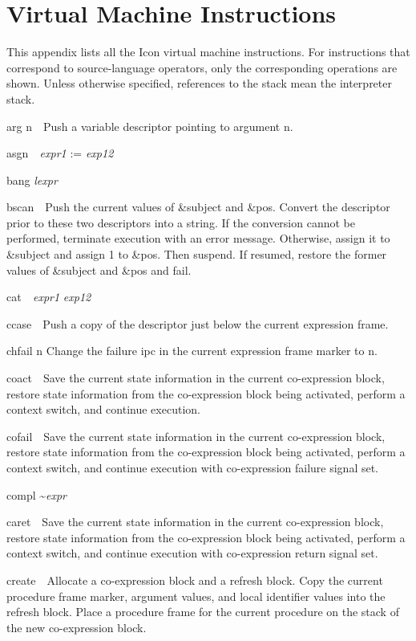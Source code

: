 \chapter{Virtual Machine Instructions}

This appendix lists all the Icon virtual machine instructions. For
instructions that correspond to source-language operators, only the
corresponding operations are shown. Unless otherwise specified,
references to the stack mean the interpreter stack.


arg n\ \ Push a variable descriptor pointing to argument n.


asgn\textit{\ \ expr1 }:= \textit{exp12}


bang \textit{lexpr}


bscan\ \ Push the current values of \&subject and \&pos. Convert the
descriptor prior to these two descriptors into a string. If the
conversion cannot be performed, terminate execution with an error
message. Otherwise, assign it to \&subject and assign 1 to \&pos. Then
suspend. If resumed, restore the former values of \&subject and \&pos
and fail.


cat\textit{\ \ expr1 {\textbar}{\textbar}} \textit{exp12}


ccase\ \ Push a copy of the descriptor just below the current expression frame.


chfail n Change the failure ipc in the current expression frame marker to n.


coact\ \ Save the current state information in the current
co-expression block, restore state information from the co-expression
block being activated, perform a context switch, and continue
execution.


cofail\ \ Save the current state information in the current
co-expression block, restore state information from the co-expression
block being activated, perform a context switch, and continue
execution with co-expression failure signal set.


compl \~{}\textit{expr}


caret\ \ Save the current state information in the current
co-expression block, restore state information from the co-expression
block being activated, perform a context switch, and continue
execution with co-expression return signal set.


create\ \ Allocate a co-expression block and a refresh block. Copy the
current procedure frame marker, argument values, and local identifier
values into the refresh block. Place a procedure frame for the current
procedure on the stack of the new co-expression block.


